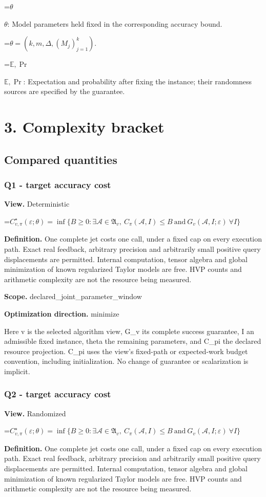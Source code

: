 \documentclass[10pt,a4paper]{article}
\newcommand{\AtlasMath}[1]{\par\begingroup\centering\setbox0=\hbox{$\displaystyle #1$}\ifdim\wd0>1.4\linewidth\typeout{ATLAS WIDE FORMULA: \the\wd0}\fi\ifdim\wd0>\linewidth\resizebox{\linewidth}{!}{\box0}\else\box0\fi\par\endgroup}
\newcommand{\AtlasInlineMath}[1]{\begingroup\setbox0=\hbox{$#1$}\ifdim\wd0>.4\linewidth\endgroup\AtlasMath{#1}\else\endgroup$#1$\fi}
\begin{document}
\AtlasInlineMath{\theta}: Model parameters held fixed in the corresponding accuracy bound.


\AtlasMath{\theta=(k,m,\Delta,(M_j)_{j=1}^k).}


\AtlasInlineMath{\mathbb{E},\Pr}: Expectation and probability after fixing the instance; their randomness sources are specified by the guarantee.

\section{3. Complexity bracket}
\subsection{Compared quantities}
\subsubsection{Q1 - target accuracy cost}
\textbf{View.} Deterministic

\AtlasMath{C^\star_{v,\pi}(\varepsilon;\theta)=\inf\{B\ge0:\exists\mathcal A\in\mathfrak A_v,\ C_\pi(\mathcal A,I)\le B\ \text{and}\ G_v(\mathcal A,I;\varepsilon)\ \forall I\}}
\textbf{Definition.} One complete jet costs one call, under a fixed cap on every execution path. Exact real feedback, arbitrary precision and arbitrarily small positive query displacements are permitted. Internal computation, tensor algebra and global minimization of known regularized Taylor models are free. HVP counts and arithmetic complexity are not the resource being measured.

\textbf{Scope.} declared\_joint\_parameter\_window

\textbf{Optimization direction.} minimize

Here v is the selected algorithm view, G\_v its complete success guarantee, I an admissible fixed instance, theta the remaining parameters, and C\_pi the declared resource projection. C\_pi uses the view's fixed-path or expected-work budget convention, including initialization. No change of guarantee or scalarization is implicit.

\subsubsection{Q2 - target accuracy cost}
\textbf{View.} Randomized

\AtlasMath{C^\star_{v,\pi}(\varepsilon;\theta)=\inf\{B\ge0:\exists\mathcal A\in\mathfrak A_v,\ C_\pi(\mathcal A,I)\le B\ \text{and}\ G_v(\mathcal A,I;\varepsilon)\ \forall I\}}
\textbf{Definition.} One complete jet costs one call, under a fixed cap on every execution path. Exact real feedback, arbitrary precision and arbitrarily small positive query displacements are permitted. Internal computation, tensor algebra and global minimization of known regularized Taylor models are free. HVP counts and arithmetic complexity are not the resource being measured.
\end{document}
